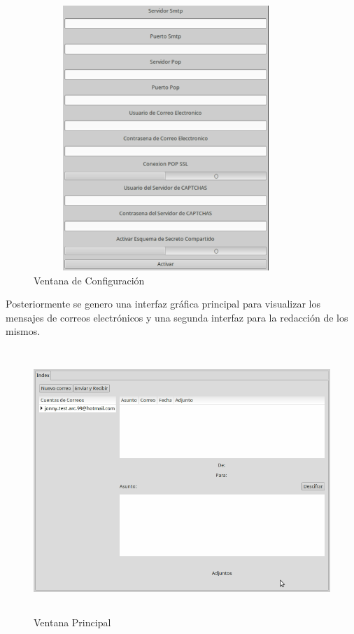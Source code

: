 \begin{figure}[H]
\centering
	\includegraphics[width=10cm, height=10cm]{./images/VentanaConfig.png}
	\caption{Ventana de Configuración}
	\label{fig:6-10-1}
\end{figure}

Posteriormente se genero una interfaz gráfica principal para visualizar los mensajes de correos electrónicos y una segunda interfaz para la redacción de los mismos.

\begin{figure}[H]
\centering
	\includegraphics[width=15cm, height=10cm]{./images/VentanaPrincipal.png}
	\caption{Ventana Principal}
	\label{fig:6-10-2}
\end{figure}

